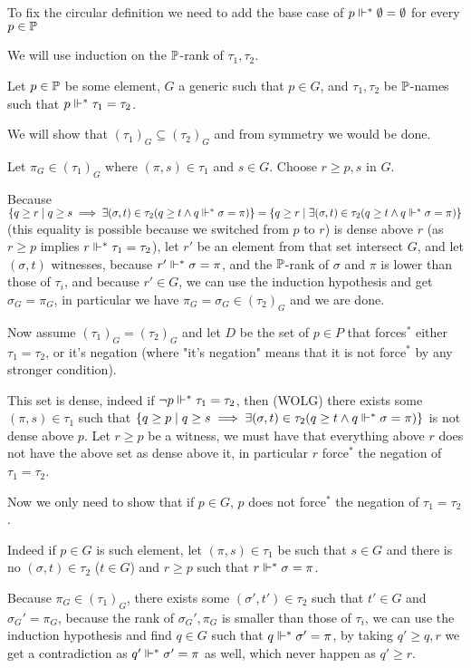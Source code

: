 \begin{cExercise}
	\begin{cPart}
		To fix the circular definition we need to add the base case of $p\force^* \emptyset=\emptyset$ for every $p\in\P$
	\end{cPart}
	\begin{cPart}
		We will use induction on the $\P$-rank of $\tau_1,\tau_2$.
		
		Let $p\in\P$ be some element, $G$ a generic such that $p\in G$, and $\tau_1,\tau_2$ be $\P$-names such that $p\force^*\tau_1=\tau_2$.
		
		We will show that $(\tau_1)_G\subseteq(\tau_2)_G$ and from symmetry we would be done.
		
		Let $\pi_G\in(\tau_1)_G$ where $(\pi,s)\in\tau_1$ and $s\in G$. Choose $r\ge p,s$ in $G$.
		 
		Because $\{q\ge r\mid q\ge s\implies \exists(\sigma, t)\in\tau_2(q\ge t\land q\force^*\sigma=\pi)\}=\{q\ge r\mid \exists(\sigma, t)\in\tau_2(q\ge t\land q\force^*\sigma=\pi)\}$ (this equality is possible because we switched from $p$ to $r$) is dense above $r$ (as $r\ge p$ implies $r\force^*\tau_1=\tau_2$), let $r'$ be an element from that set intersect $G$, and let $(\sigma,t)$ witnesses, because $r'\force^*\sigma=\pi$, and the $\P$-rank of $\sigma$ and $\pi$ is lower than those of $\tau_i$, and because $r'\in G$, we can use the induction hypothesis and get $\sigma_G=\pi_G$, in particular we have $\pi_G=\sigma_G\in(\tau_2)_G$ and we are done.
		
		
		Now assume $(\tau_1)_G=(\tau_2)_G$ and let $D$ be the set of $p\in P$ that forces$^*$ either $\tau_1=\tau_2$, or it's negation (where "it's negation" means that it is not force$^*$ by any stronger condition).
		
		This set is dense, indeed if $\lnot p\force^*\tau_1=\tau_2$, then (WOLG) there exists some $(\pi,s)\in \tau_1$ such that $\{q\ge p\mid q\ge s\implies \exists(\sigma, t)\in\tau_2(q\ge t\land q\force^*\sigma=\pi)\}$ is not dense above $p$. Let $r\ge p$ be a witness, we must have that everything above $r$ does not have the above set as dense above it, in particular $r$ force$^*$ the negation of $\tau_1=\tau_2$.
		
		Now we only need to show that if $p\in G$, $p$ does not force$^*$ the negation of $\tau_1=\tau_2$.
		
		Indeed if $p\in G$ is such element, let $(\pi,s)\in\tau_1$ be such that $s\in G$ and there is no $(\sigma,t)\in\tau_2$ ($t\in G$) and $r\ge p$ such that $r\force^*\sigma=\pi$.
		
		Because $\pi_G\in(\tau_1)_G$, there exists some $(\sigma',t')\in \tau_2$ such that $t'\in G$ and $\sigma_G'=\pi_G$, because the rank of $\sigma_G',\pi_G$ is smaller than those of $\tau_i$, we can use the induction hypothesis and find $q\in G$ such that $q\force^*\sigma'=\pi$, by taking $q'\ge q,r$ we get a contradiction as $q'\force^*\sigma'=\pi$ as well, which never happen as $q'\ge r$.
	\end{cPart}
\end{cExercise}
